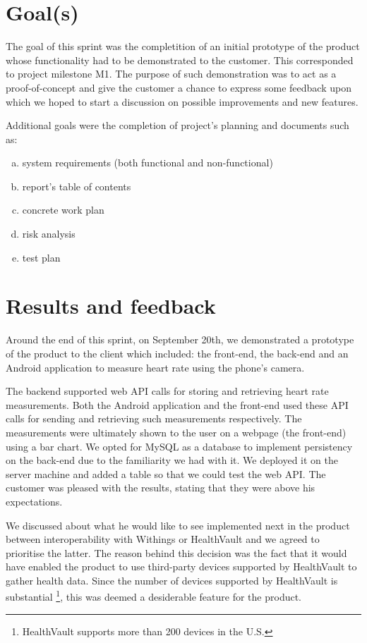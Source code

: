 \section{Goal(s)}

The goal of this sprint was the completition of an initial prototype of the product whose functionality had to be demonstrated to the customer.
This corresponded to project milestone M1.
The purpose of such demonstration was to act as a proof-of-concept and give the customer a chance to express some feedback upon which we hoped to start a discussion on possible improvements and new features.

Additional goals were the completion of project's planning and documents such as:
\begin{enumerate}[a)]
\item system requirements (both functional and non-functional)
\item report's table of contents
\item concrete work plan
\item risk analysis
\item test plan
\end{enumerate}


\section{Results and feedback}

Around the end of this sprint, on September 20th, we demonstrated a prototype of the product to
the client which included: the front-end, the back-end and an Android application to measure heart rate using the phone's camera.

The backend supported web API calls for storing and retrieving heart rate measurements.
Both the Android application and the front-end used these API calls for sending and retrieving such measurements respectively.
The measurements were ultimately shown to the user on a webpage (the front-end) using a bar chart.
We opted for MySQL as a database to implement persistency on the back-end due to the familiarity we had with it. 
We deployed it on the server machine and added a table so that we could test the web API.
The customer was pleased with the results, stating that they were above his expectations.

We discussed about what he would like to see implemented next in the product between interoperability with Withings or HealthVault and we agreed to prioritise the latter.
The reason behind this decision was the fact that it would have enabled the product to use third-party devices supported by HealthVault to gather health data.
Since the number of devices supported by HealthVault is substantial \footnote{HealthVault supports more than 200 devices in the U.S.}, this was deemed a desiderable feature for the product.

